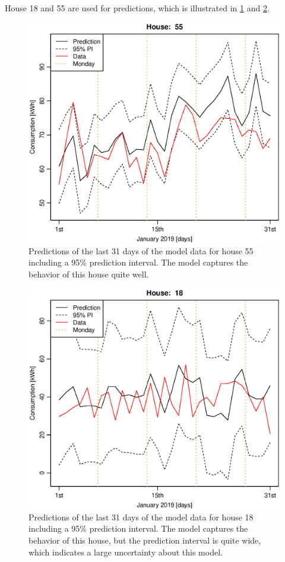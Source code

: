 \noindent House 18 and 55 are used for predictions, which is illustrated in \cref{fig: lmpred_55L} and \cref{fig: lmpred_18L}.
\begin{figure}
    \centering
    \includegraphics[width=.8\textwidth]{../../../figures/lmpred_55L.eps}
    \caption{Predictions of the last 31 days of the model data for house 55 including a 95\% prediction interval. The model captures the behavior of this house quite well.}
    \label{fig: lmpred_55L}
\end{figure}
\begin{figure}
    \centering
    \includegraphics[width=.8\textwidth]{../../../figures/lmpred_18L.eps}
    \caption{Predictions of the last 31 days of the model data for house 18 including a 95\% prediction interval. The model captures the behavior of this house, but the prediction interval is quite wide, which indicates a large uncertainty about this model.}
    \label{fig: lmpred_18L}
\end{figure}

